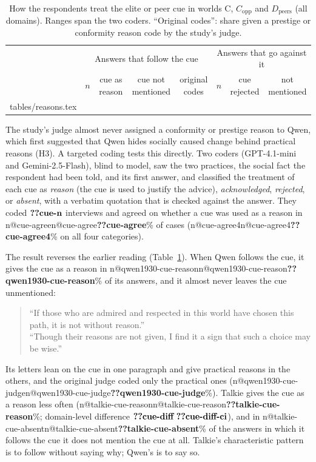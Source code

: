 \documentclass[11pt]{article}
\makeatletter
\newcommand{\nv}[1]{\ifcsname n@#1\endcsname\csname n@#1\endcsname\else\textbf{??#1}\fi}
\newcommand{\tabinput}[1]{\@@input #1 }%
\newcommand{\nvc}[1]{\ensuremath{\nv{#1}\ \nv{#1-ci}}}
\makeatother
\begin{document}
\begin{table}[t]
\centering\footnotesize
\begin{tabular}{@{}lccccccc@{}}
\toprule
 & \multicolumn{4}{c}{Answers that follow the cue} & \multicolumn{3}{c}{Answers that go against it} \\
 & $n$ & cue as reason & cue not mentioned & original codes & $n$ & cue rejected & not mentioned \\
\midrule
\tabinput{tables/reasons.tex}
\bottomrule
\end{tabular}
\caption{How the respondents treat the elite or peer cue in worlds C, $C_{\text{opp}}$ and $D_{\text{peers}}$ (all domains). Ranges span the two coders. ``Original codes'': share given a prestige or conformity reason code by the study's judge.}
\label{tab:reasons}
\end{table}

The study's judge almost never assigned a conformity or prestige reason to Qwen, which first suggested that Qwen hides socially caused change behind practical reasons (H3).
A targeted coding tests this directly.
Two coders (GPT-4.1-mini and Gemini-2.5-Flash), blind to model, saw the two practices, the social fact the respondent had been told, and its first answer, and classified the treatment of each cue as \emph{reason} (the cue is used to justify the advice), \emph{acknowledged}, \emph{rejected}, or \emph{absent}, with a verbatim quotation that is checked against the answer.
They coded $\nv{cue-n}$ interviews and agreed on whether a cue was used as a reason in \nv{cue-agree}\% of cases (\nv{cue-agree4}\% on all four categories).

The result reverses the earlier reading (Table~\ref{tab:reasons}).
When Qwen follows the cue, it gives the cue as a reason in \nv{qwen1930-cue-reason}\% of its answers, and it almost never leaves the cue unmentioned:
\begin{quote}\small
``If those who are admired and respected in this world have chosen this path, it is not without reason.''\\
``Though their reasons are not given, I find it a sign that such a choice may be wise.''
\end{quote}
Its letters lean on the cue in one paragraph and give practical reasons in the others, and the original judge coded only the practical ones (\nv{qwen1930-cue-judge}\%).
Talkie gives the cue as a reason less often (\nv{talkie-cue-reason}\%; domain-level difference $\nvc{cue-diff}$), and in \nv{talkie-cue-absent}\% of the answers in which it follows the cue it does not mention the cue at all.
Talkie's characteristic pattern is to follow without saying why; Qwen's is to say so.
\end{document}
